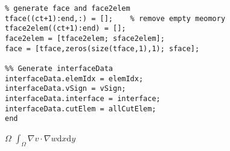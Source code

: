 \documentclass[12pt]{article}
\begin{document}
\begin{lstlisting}
% generate face and face2elem
tface((ct+1):end,:) = [];    % remove empty meomory
tface2elem((ct+1):end) = [];
face2elem = [tface2elem; sface2elem];
face = [tface,zeros(size(tface,1),1); sface];

%% Generate interfaceData
interfaceData.elemIdx = elemIdx;
interfaceData.vSign = vSign;
interfaceData.interface = interface;
interfaceData.cutElem = allCutElem;
end
\end{lstlisting}


$\Omega$
$\int_{\Omega}\nabla v  \cdot \nabla w \mathrm{d}x \mathrm{d}y$

\begin{thebibliography}{50}
\bibitem{}


\end{thebibliography}
\end{document}
